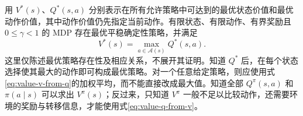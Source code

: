 \documentclass[UTF8]{ctexart}
\begin{document}
用 $V^*(s)$、$Q^*(s,a)$ 分别表示在所有允许策略中可达到的最优状态价值和最优动作价值，其中动作价值仍先指定当前动作。有限状态、有限动作、有界奖励且 $0\leq\gamma<1$ 的 MDP 存在最优平稳确定性策略，并满足
\begin{equation}
  V^*(s)=\max_{a\in\mathcal A(s)}Q^*(s,a).
  \label{eq:value-optimal}
\end{equation}
这里仅陈述最优策略存在性及相应关系，不展开其证明。知道 $Q^*$ 后，在每个状态选择使其最大的动作即可构成最优策略。对一个任意给定策略，则应使用式\eqref{eq:value-v-from-q}的加权平均，而不能直接改成最大值。知道全部 $Q^\pi(s,a)$ 和 $\pi(a\mid s)$ 可以求出 $V^\pi(s)$；反过来，只知道 $V^\pi$ 一般不足以比较动作，还需要环境的奖励与转移信息，才能使用式\eqref{eq:value-q-from-v}。
\end{document}

